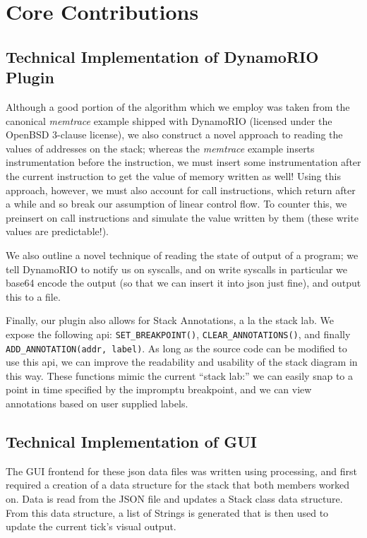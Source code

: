 \documentclass[12pt]{article}
\newcommand{\code}[1]{\texttt{#1}}
\begin{document}
\section{Core Contributions}

\subsection{Technical Implementation of DynamoRIO Plugin}
Although a good portion of the algorithm which we employ was taken from the canonical
\textit{memtrace} example shipped with DynamoRIO (licensed under the OpenBSD 3-clause
license), we also construct a novel approach to reading the values of addresses on the
stack; whereas the \textit{memtrace} example inserts instrumentation before the instruction,
we must insert some instrumentation after the current instruction to get the value of memory
written as well! Using this approach, however, we must also account for call instructions, which
return after a while and so break our assumption of linear control flow. To counter this, we
preinsert on call instructions and simulate the value written by them (these write values are
predictable!). 

We also outline a novel technique of reading the state of output of a program; we tell
DynamoRIO to notify us on syscalls, and on write syscalls in particular we base64 encode
the output (so that we can insert it into json just fine), and output this to a file.

Finally, our plugin also allows for Stack Annotations, a la the stack lab. We expose the following
api: \code{SET\_BREAKPOINT()}, \code{CLEAR\_ANNOTATIONS()}, and finally
\code{ADD\_ANNOTATION(addr, label)}. As long as the source code can be modified to use
this api, we can improve the readability and usability of the stack diagram in this way. These
functions mimic the current “stack lab:” we can easily snap to a point in time specified by the
impromptu breakpoint, and we can view annotations based on user supplied labels.

\subsection{Technical Implementation of GUI}
The GUI frontend for these json data files was written using processing, and first required a
creation of a data structure for the stack that both members worked on. Data is read from the JSON
file and updates a Stack class data structure. From this data structure, a list of Strings is
generated that is then used to update the current tick’s visual output.
\end{document}
